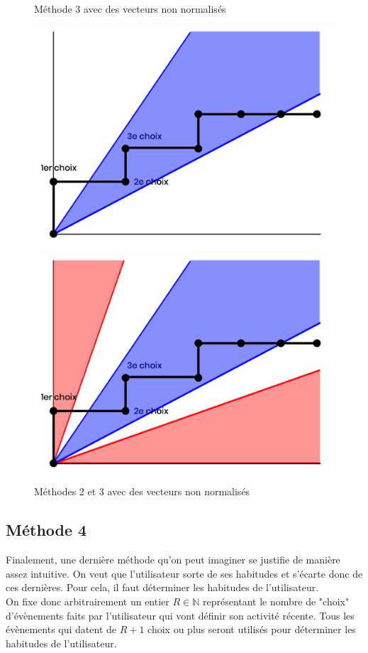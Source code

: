\documentclass[11pt, oneside]{article}
\begin{document}
\begin{figure}[h]
    \caption{Méthode 3 avec des vecteurs non normalisés}
   \includegraphics[width=\linewidth]{conebleu.png}
   \caption{Méthodes 2 et 3 avec des vecteurs non normalisés}
   \includegraphics[width=\linewidth]{conerougeetbleu.png}
\end{figure}

\subsection{Méthode 4}

Finalement, une dernière méthode qu'on peut imaginer se justifie de manière assez intuitive. On veut que l'utilisateur sorte de ses habitudes et s'écarte donc de ces dernières. Pour cela, il faut déterminer les habitudes de l'utilisateur.\\
On fixe donc arbitrairement un entier $R\in \mathbb{N}$ représentant le nombre de "choix" d'évènements faits par l'utilisateur qui vont définir son activité récente. Tous les évènements qui datent de $R+1$ choix ou plus seront utilisés pour déterminer les habitudes de l'utilisateur.\\
\end{document}
